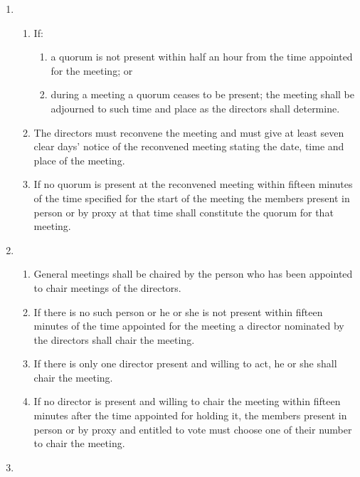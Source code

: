 \begin{enumerate}
\item
  \begin{enumerate}
  \item
    If:
    \begin{enumerate}
    \item
      a quorum is not present within half an hour from the time appointed
      for the meeting; or
    \item
      during a meeting a quorum ceases to be present; the meeting shall
      be adjourned to such time and place as the directors shall
      determine.
    \end{enumerate}
  \item
    The directors must reconvene the meeting and must give at least
    seven clear days' notice of the reconvened meeting stating the
    date, time and place of the meeting.
  \item
    If no quorum is present at the reconvened meeting within fifteen
    minutes of the time specified for the start of the meeting the
    members present in person or by proxy at that time shall constitute
    the quorum for that meeting.
  \end{enumerate}
\item
  

  \begin{enumerate}
  \item
    General meetings shall be chaired by the person who has been
    appointed to chair meetings of the directors.
  \item
    If there is no such person or he or she is not present within
    fifteen minutes of the time appointed for the meeting a director
    nominated by the directors shall chair the meeting.
  \item
    If there is only one director present and willing to act, he or she
    shall chair the meeting.
  \item
    If no director is present and willing to chair the meeting within
    fifteen minutes after the time appointed for holding it, the
    members present in person or by proxy and entitled to vote must
    choose one of their number to chair the meeting.
  \end{enumerate}
\item
  


\end{enumerate}
